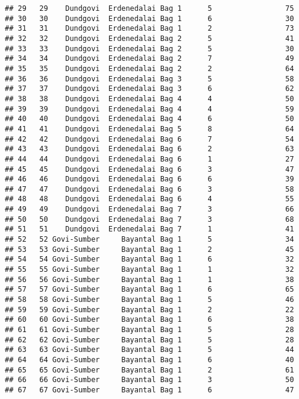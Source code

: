 \documentclass[
]{article}
\begin{document}
\begin{verbatim}
## 29   29    Dundgovi  Erdenedalai Bag 1      5                 75
## 30   30    Dundgovi  Erdenedalai Bag 1      6                 30
## 31   31    Dundgovi  Erdenedalai Bag 1      2                 73
## 32   32    Dundgovi  Erdenedalai Bag 2      5                 41
## 33   33    Dundgovi  Erdenedalai Bag 2      5                 30
## 34   34    Dundgovi  Erdenedalai Bag 2      7                 49
## 35   35    Dundgovi  Erdenedalai Bag 2      2                 64
## 36   36    Dundgovi  Erdenedalai Bag 3      5                 58
## 37   37    Dundgovi  Erdenedalai Bag 3      6                 62
## 38   38    Dundgovi  Erdenedalai Bag 4      4                 50
## 39   39    Dundgovi  Erdenedalai Bag 4      4                 59
## 40   40    Dundgovi  Erdenedalai Bag 4      6                 50
## 41   41    Dundgovi  Erdenedalai Bag 5      8                 64
## 42   42    Dundgovi  Erdenedalai Bag 6      7                 54
## 43   43    Dundgovi  Erdenedalai Bag 6      2                 63
## 44   44    Dundgovi  Erdenedalai Bag 6      1                 27
## 45   45    Dundgovi  Erdenedalai Bag 6      3                 47
## 46   46    Dundgovi  Erdenedalai Bag 6      6                 39
## 47   47    Dundgovi  Erdenedalai Bag 6      3                 58
## 48   48    Dundgovi  Erdenedalai Bag 6      4                 55
## 49   49    Dundgovi  Erdenedalai Bag 7      3                 66
## 50   50    Dundgovi  Erdenedalai Bag 7      3                 68
## 51   51    Dundgovi  Erdenedalai Bag 7      1                 41
## 52   52 Govi-Sumber     Bayantal Bag 1      5                 34
## 53   53 Govi-Sumber     Bayantal Bag 1      2                 45
## 54   54 Govi-Sumber     Bayantal Bag 1      6                 32
## 55   55 Govi-Sumber     Bayantal Bag 1      1                 32
## 56   56 Govi-Sumber     Bayantal Bag 1      1                 38
## 57   57 Govi-Sumber     Bayantal Bag 1      6                 65
## 58   58 Govi-Sumber     Bayantal Bag 1      5                 46
## 59   59 Govi-Sumber     Bayantal Bag 1      2                 22
## 60   60 Govi-Sumber     Bayantal Bag 1      6                 38
## 61   61 Govi-Sumber     Bayantal Bag 1      5                 28
## 62   62 Govi-Sumber     Bayantal Bag 1      5                 28
## 63   63 Govi-Sumber     Bayantal Bag 1      5                 44
## 64   64 Govi-Sumber     Bayantal Bag 1      6                 40
## 65   65 Govi-Sumber     Bayantal Bag 1      2                 61
## 66   66 Govi-Sumber     Bayantal Bag 1      3                 50
## 67   67 Govi-Sumber     Bayantal Bag 1      6                 47

\end{verbatim}
\end{document}
